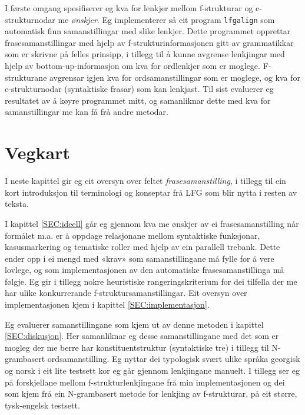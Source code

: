 \documentclass[11pt,a4paper,oneside,draft]{report}
\begin{document}
I første omgang spesifiserer eg kva for lenkjer mellom f-strukturar og
 c-strukturnodar me \emph{ønskjer}. Eg implementerer så eit program
 \texttt{lfgalign} som automatisk finn samanstillingar med slike lenkjer.
 Dette programmet opprettar frasesamanstillingar med hjelp av
 f-strukturinformasjonen gitt av grammatikkar som er skrivne på felles
 prinsipp, i tillegg til å kunne avgrense lenkjingar med hjelp av
 bottom-up-informasjon om kva for ordlenkjer som er
 moglege. F-strukturane avgrensar igjen kva for ordsamanstillingar som
 er moglege, og kva for c-strukturnodar (syntaktiske frasar) som kan
 lenkjast. Til sist evaluerer eg resultatet av å køyre programmet
 mitt, og samanliknar dette med kva for samanstillingar me kan få frå
 andre metodar.



\section{Vegkart}
\label{sec-1.1}

I neste kapittel gir eg eit oversyn over feltet \emph{frasesamanstilling},
i tillegg til ein kort introduksjon til terminologi og konseptar frå
LFG som blir nytta i resten av teksta.

I kapittel \ref{SEC:ideell} går eg gjennom kva me ønskjer av ei
frasesamanstilling når formålet m.a. er å oppdage relasjonane mellom
syntaktiske funksjonar, kasusmarkering og tematiske roller med hjelp
av ein parallell trebank. Dette ender opp i ei mengd med «krav» som
samanstillingane må fylle for å vere lovlege, og som implementasjonen
av den automatiske frasesamanstillinga må følgje. Eg gir i tillegg
nokre heuristiske rangeringskriterium for dei tilfella der me har
ulike konkurrerande f-struktursamanstillingar. Eit oversyn over
implementasjonen kjem i kapittel \ref{SEC:implementasjon}.

Eg evaluerer samanstillingane som kjem ut av denne metoden i kapittel
\ref{SEC:diskusjon}. Her samanliknar eg desse samanstillingane med det
som er mogleg der me berre har konstituentstruktur (syntaktiske tre) i
tillegg til N-grambasert ordsamanstilling. Eg nyttar dei typologisk
svært ulike språka georgisk og norsk i eit lite testsett kor eg går
gjennom lenkjingane manuelt. I tillegg ser eg på forskjellane mellom
f-strukturlenkjingane frå min implementasjonen og dei som kjem frå ein
N-grambasert metode for lenkjing av f-strukturar, på eit større,
tysk-engelsk testsett.
\end{document}
